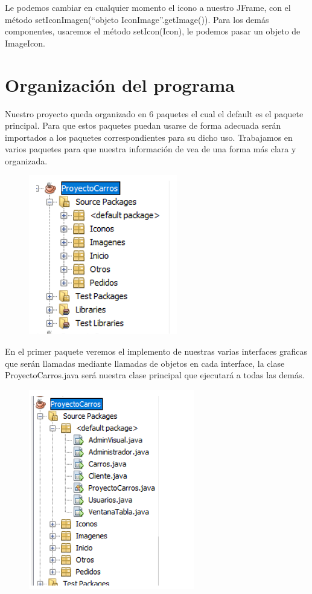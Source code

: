 \documentclass[12pt,a4paper]{report}
\begin{document}
{Le podemos cambiar en cualquier momento el icono a nuestro JFrame, con el método setIconImagen(“objeto IconImage”.getImage()). Para los demás componentes, usaremos el método setIcon(Icon), le podemos pasar un objeto de ImageIcon.

\section*{Organización del programa}
Nuestro proyecto queda organizado en 6 paquetes el cual el default es el paquete principal. Para que estos paquetes puedan usarse de forma adecuada serán importados a los paquetes correspondientes para su dicho uso. Trabajamos en varios paquetes para que nuestra información de vea de una forma más clara y organizada.

\begin{figure}[hbtp]
\centering
\includegraphics[scale=0.5]{OP1.PNG}
\end{figure}


En el primer paquete veremos el implemento de nuestras varias interfaces graficas que serán llamadas mediante llamadas de objetos en cada interface, la clase ProyectoCarros.java será nuestra clase principal que ejecutará a todas las demás. 

\begin{figure}[hbtp]
\centering
\includegraphics[scale=0.5]{OP2.PNG}
\end{figure}

}
\end{document}
